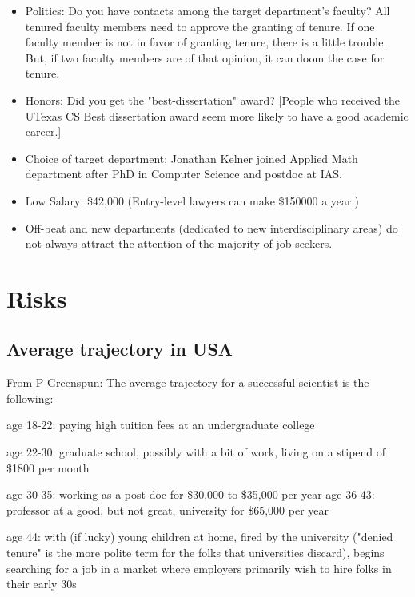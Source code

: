 \documentclass[oneside, article]{memoir}
\begin{document}
\begin{itemize}
\item Politics:
\subitem Do you have contacts among the target department's faculty?
\subitem All tenured faculty members need to approve the granting of tenure. If one faculty member is not in favor of granting tenure, there is a little trouble. But, if two faculty members are of that opinion, it can doom the case for tenure.

\item Honors:
\subitem Did you get the "best-dissertation" award? [People who received the UTexas CS Best dissertation award seem more likely to have a good academic career.]

\item Choice of target department:
\subitem Jonathan Kelner joined Applied Math department after PhD in Computer Science and postdoc at IAS.

\item Low Salary: \$42,000 (Entry-level lawyers can make \$150000 a year.)

\item Off-beat and new departments (dedicated to new interdisciplinary areas) do not always attract the attention of the majority of job seekers.
\end{itemize}


\section{Risks}
\subsection{Average trajectory in USA}
From P Greenspun: The average trajectory for a successful scientist is the following:

age 18-22: paying high tuition fees at an undergraduate college

age 22-30: graduate school, possibly with a bit of work, living on a stipend of \$1800 per month

age 30-35: working as a post-doc for \$30,000 to \$35,000 per year
age 36-43: professor at a good, but not great, university for \$65,000 per year

age 44: with (if lucky) young children at home, fired by the university ("denied tenure" is the more polite term for the folks that universities discard), begins searching for a job in a market where employers primarily wish to hire folks in their early 30s 
\end{document}
